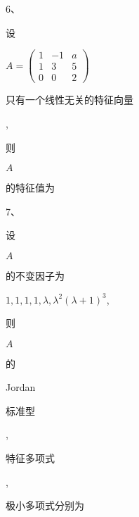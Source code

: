 \documentclass[10pt]{article}
\begin{document}
6、\begin{CJK}{UTF8}{mj}设\end{CJK} $A=\left(\begin{array}{ccc}1 & -1 & a \\ 1 & 3 & 5 \\ 0 & 0 & 2\end{array}\right)$ \begin{CJK}{UTF8}{mj}只有一个线性无关的特征向量\end{CJK}, \begin{CJK}{UTF8}{mj}则\end{CJK} $A$ \begin{CJK}{UTF8}{mj}的特征值为\end{CJK}

7、\begin{CJK}{UTF8}{mj}设\end{CJK} $A$ \begin{CJK}{UTF8}{mj}的不变因子为\end{CJK} $1,1,1,1, \lambda, \lambda^{2}(\lambda+1)^{3}$, \begin{CJK}{UTF8}{mj}则\end{CJK} $A$ \begin{CJK}{UTF8}{mj}的\end{CJK} Jordan \begin{CJK}{UTF8}{mj}标准型\end{CJK}, \begin{CJK}{UTF8}{mj}特征多项式\end{CJK}, \begin{CJK}{UTF8}{mj}极小多项式分别为\end{CJK}
\end{document}
